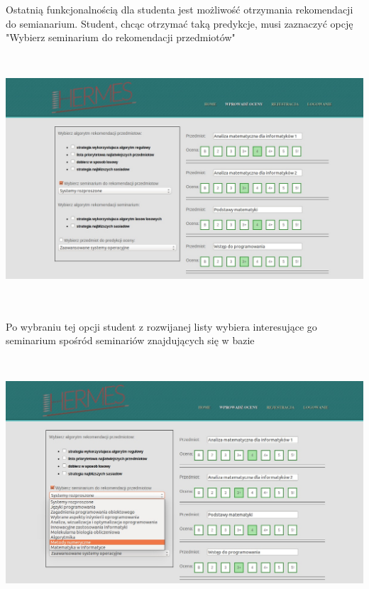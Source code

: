 \documentclass[licencjacka]{pracamgr}
\begin{document}
Ostatnią funkcjonalnością dla studenta jest możliwość otrzymania rekomendacji do semianarium. Student, chcąc otrzymać taką predykcje, musi zaznaczyć opcję "Wybierz seminarium do rekomendacji przedmiotów" \par
~\\
\begin{minipage}{\linewidth}
	\centering
           \includegraphics[scale=0.5]{rekPrzedmSem.jpg}
\end{minipage} \\ \\
\newpage
Po wybraniu tej opcji student z rozwijanej listy wybiera interesujące go seminarium spośród seminariów znajdujących się w bazie \par
~\\
\begin{minipage}{\linewidth}
	\centering
           \includegraphics[scale=0.5]{rekPrzedmSemSelect.jpg}
\end{minipage} \\ \\
\end{document}
